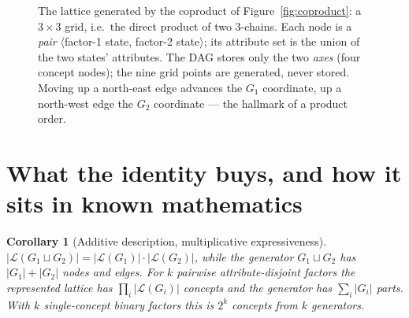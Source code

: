 \documentclass[11pt]{article}
\theoremstyle{definition}
\theoremstyle{plain}
\newtheorem{corollary}{Corollary}
\theoremstyle{remark}
\newcommand{\Lgen}{\mathcal{L}}            %
\newcommand{\Gcoprod}{\sqcup}             %
\begin{document}
\begin{figure}[h]
\centering
{}
\caption{The lattice generated by the coproduct of Figure~\ref{fig:coproduct}: a
$3\times 3$ grid, i.e.\ the direct product of two $3$-chains. Each node is a
\emph{pair} $\langle$factor-1 state, factor-2 state$\rangle$; its attribute set is
the union of the two states' attributes. The DAG stores only the two \emph{axes}
(four concept nodes); the nine grid points are generated, never stored. Moving up
a north-east edge advances the $G_1$ coordinate, up a north-west edge the $G_2$
coordinate --- the hallmark of a product order.}
\label{fig:grid}
\end{figure}

\section{What the identity buys, and how it sits in known mathematics}
\label{sec:buys}

\begin{corollary}[Additive description, multiplicative expressiveness]
\label{cor:size}
$\bigl|\Lgen(G_1\Gcoprod G_2)\bigr| = |\Lgen(G_1)|\cdot|\Lgen(G_2)|$, while the
generator $G_1\Gcoprod G_2$ has $|G_1|+|G_2|$ nodes and edges. For $k$ pairwise
attribute-disjoint factors the represented lattice has $\prod_i|\Lgen(G_i)|$
concepts and the generator has $\sum_i|G_i|$ parts. With $k$ single-concept
binary factors this is $2^{k}$ concepts from $k$ generators.
\end{corollary}
\end{document}
